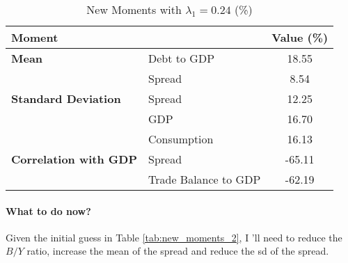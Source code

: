 \documentclass{article}
\begin{document}
\begin{table}[h]
    \centering
    \begin{tabular}{llc}
        \toprule
        \textbf{Moment}               &                      & \textbf{Value (\%)} \\
        \midrule
        \textbf{Mean}                 & Debt to GDP          & 18.55               \\
                                      & Spread               & 8.54                \\
        \addlinespace
        \textbf{Standard Deviation}   & Spread               & 12.25               \\
                                      & GDP                  & 16.70               \\
                                      & Consumption          & 16.13               \\
        \addlinespace
        \textbf{Correlation with GDP} & Spread               & -65.11              \\
                                      & Trade Balance to GDP & -62.19              \\
        \bottomrule
    \end{tabular}
    \caption{New Moments with $\lambda_1 = 0.24$ (\%)} \label{tab:new_moments_8}
\end{table}

\paragraph{What to do now?} Given the initial guess in Table \ref{tab:new_moments_2}, I 'll need to reduce
the $B/Y$ ratio, increase the mean of the spread and reduce the sd of the
spread.
\end{document}
